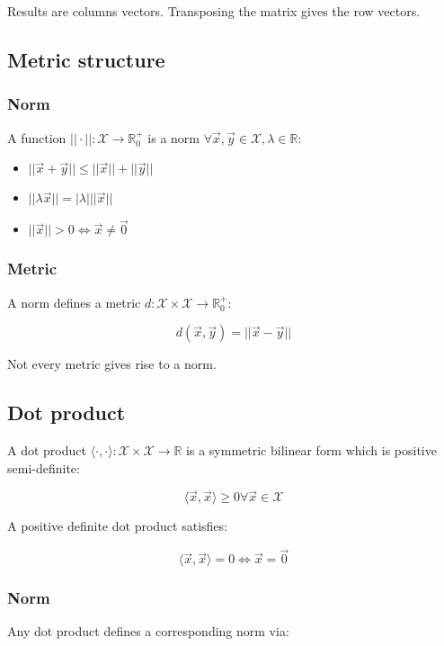 	Results are columns vectors.
	Transposing the matrix gives the row vectors.

	\subsection{Metric structure}

		\subsubsection{Norm}
		A function $||\cdot ||: \mathcal{X} \rightarrow \mathbb{R}^+_0$ is a norm $\forall \vec{x},\vec{y}\in\mathcal{X},\lambda\in\mathbb{R}$:

		\begin{multicols}{3}
			\begin{itemize}
				\item $||\vec{x} + \vec{y}|| \le ||\vec{x}|| + ||\vec{y}||$
				\item $||\lambda \vec{x} || = |\lambda| ||\vec{x}||$
				\item $||\vec{x}||>0 \Leftrightarrow\vec{x}\neq \vec{0}$
			\end{itemize}
		\end{multicols}

		\subsubsection{Metric}
		A norm defines a metric $d: \mathcal{X}\times\mathcal{X}\rightarrow\mathbb{R}_0^+$:

		$$d(\vec{x},\vec{y}) = ||\vec{x} - \vec{y}||$$

		Not every metric gives rise to a norm.

	\subsection{Dot product}
	A dot product $\langle \cdot, \cdot\rangle:\mathcal{X}\times\mathcal{X}\rightarrow\mathbb{R}$ is a symmetric bilinear form which is positive semi-definite:

	$$\langle \vec{x}, \vec{x}\rangle \ge 0\forall \vec{x} \in\mathcal{X}$$

	A positive definite dot product satisfies:

	$$\langle \vec{x}, \vec{x}\rangle = 0 \Leftrightarrow \vec{x} = \vec{0}$$

		\subsubsection{Norm}
		Any dot product defines a corresponding norm via:

